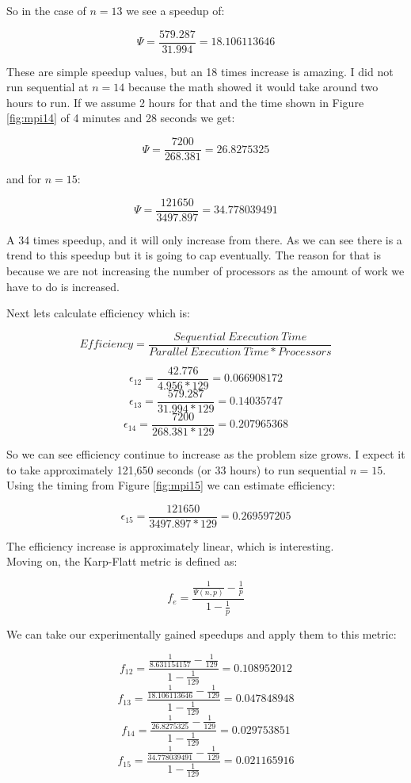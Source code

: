 \documentclass{article}
\begin{document}
So in the case of $n=13$ we see a speedup of:

$$\Psi = \frac{579.287}{31.994} = 18.106113646$$

These are simple speedup values, but an 18 times increase is amazing. I did not 
run sequential at $n=14$ because the math showed it would take around two hours 
to run. If we assume 2 hours for that and the time shown in Figure 
\ref{fig:mpi14} of 4 minutes and 28 seconds we get:

$$\Psi = \frac{7200}{268.381} = 26.8275325$$

and for $n=15$:

$$\Psi = \frac{121650}{3497.897} = 34.778039491$$

A 34 times speedup, and it will only increase from there. As we can see there is 
a trend to this speedup but it is going to cap eventually. The reason for that 
is because we are not increasing the number of processors as the amount of work 
we have to do is increased.

Next lets calculate efficiency which is:

$$Efficiency = \frac{Sequential\ Execution\ Time}{Parallel\ Execution\ Time * Processors}$$

$$\epsilon_{12} = \frac{42.776}{4.956 * 129} = 0.066908172$$
$$\epsilon_{13} = \frac{579.287}{31.994 * 129} = 0.14035747$$
$$\epsilon_{14} = \frac{7200}{268.381 * 129} = 0.207965368$$

So we can see efficiency continue to increase as the problem size grows. I 
expect it to take approximately 121,650 seconds (or 33 hours) to run sequential 
$n=15$. Using the timing from Figure \ref{fig:mpi15} we can estimate efficiency:

$$\epsilon_{15} = \frac{121650}{3497.897 * 129} = 0.269597205$$

The efficiency increase is approximately linear, which is interesting.
\\

\noindent Moving on, the Karp-Flatt metric is defined as:

$$f_e = \frac{\frac{1}{\Psi(n, p)} - \frac{1}{p}}{1 - \frac{1}{p}}$$

We can take our experimentally gained speedups and apply them to this metric:

$$f_{12} = \frac{\frac{1}{8.631154157} - \frac{1}{129}}{1 - \frac{1}{129}} = 0.108952012$$
$$f_{13} = \frac{\frac{1}{18.106113646} - \frac{1}{129}}{1 - \frac{1}{129}} = 0.047848948$$
$$f_{14} = \frac{\frac{1}{26.8275325} - \frac{1}{129}}{1 - \frac{1}{129}} = 0.029753851$$
$$f_{15} = \frac{\frac{1}{34.778039491} - \frac{1}{129}}{1 - \frac{1}{129}} = 0.021165916$$
\end{document}
